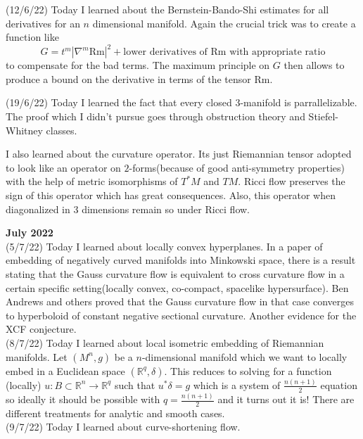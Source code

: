 \documentclass[12pt,a4paper]{article}
\newcommand{\R}{\mathbb{R}}
\begin{document}
	(12/6/22) Today I learned about the Bernstein-Bando-Shi estimates for all derivatives for an $n$ dimensional manifold. Again the crucial trick was to create a function like $$G = t^m| \nabla^m \text{Rm}|^2 + \text{lower derivatives of } \text{Rm} \text{ with appropriate ratio}$$ to compensate for the bad terms.
	The maximum principle on $G$ then allows to produce a bound on the derivative in terms of the tensor Rm.
	
	(19/6/22) Today I learned the fact that every closed $3$-manifold is parrallelizable. The proof which I didn't pursue goes through obstruction theory and Stiefel-Whitney classes.
	
	I also learned about the curvature operator. Its just Riemannian tensor adopted to look like an operator on $2$-forms(because of good anti-symmetry properties) with the help of metric isomorphisms of $T^*M$ and $TM$. 
   Ricci flow preserves the sign of this operator which has great consequences. Also, this operator when diagonalized in $3$ dimensions remain so under Ricci flow.\\
	
	\maketitle\textbf{July 2022}
	\\
	
	(5/7/22) Today I learned about locally convex hyperplanes. In a paper of embedding of negatively curved manifolds into Minkowski space, there is a result stating that the Gauss curvature flow is equivalent to cross curvature flow in a certain specific setting(locally convex, co-compact, spacelike hypersurface). 
   Ben Andrews and others proved that the Gauss curvature flow in that case converges to hyperboloid of constant negative sectional curvature. Another evidence for the XCF conjecture.\\
	
	(8/7/22) Today I learned about local isometric embedding of Riemannian manifolds. Let $(M^n,g)$ be a $n$-dimensional manifold which we want to locally embed in a Euclidean space $(\R^q,\delta)$. This reduces to solving for a function (locally) $u :B\subset\R^n \to \R^q$ such that $u^*\delta = g$ which is a system of $\frac{n(n+1)}{2}$ equation so ideally it should be possible with $q = \frac{n(n+1)}{2}$ and it turns out it is! There are different treatments for analytic and smooth cases. \\
	
	(9/7/22) Today I learned about curve-shortening flow.\\
	
\end{document}
